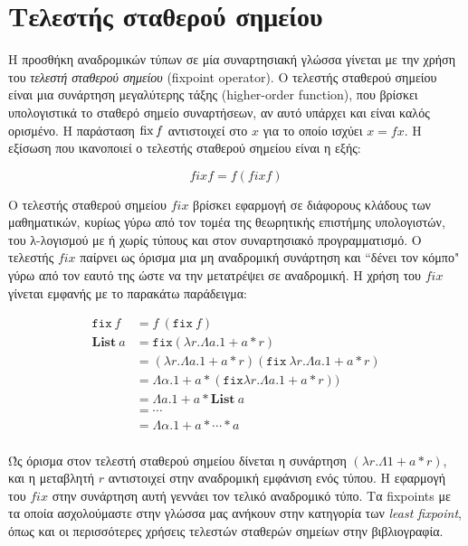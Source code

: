 
\section{Τελεστής σταθερού σημείου}

Η προσθήκη αναδρομικών τύπων σε μία συναρτησιακή γλώσσα γίνεται με την χρήση του 
\emph{τελεστή σταθερού σημείου} (fixpoint operator).  Ο τελεστής σταθερού σημείου
είναι μια συνάρτηση μεγαλύτερης τάξης (higher-order function), που βρίσκει υπολογιστικά
το σταθερό σημείο συναρτήσεων, αν αυτό υπάρχει και είναι καλός ορισμένο. Η παράσταση $\operatorname{fix} f$
αντιστοιχεί στο $x$ για το οποίο ισχύει $x = f x$.  Η εξίσωση που ικανοποιεί ο τελεστής σταθερού σημείου
είναι η εξής:

\begin{displaymath}
fix f = f ( fix f)
\end{displaymath}

Ο τελεστής σταθερού σημείου $fix$ βρίσκει εφαρμογή σε διάφορους κλάδους των μαθηματικών, κυρίως
γύρω από τον τομέα της θεωρητικής επιστήμης υπολογιστών, του λ-λογισμού με ή χωρίς τύπους και στον
συναρτησιακό προγραμματισμό. Ο τελεστής $fix$ παίρνει ως όρισμα μια μη αναδρομική συνάρτηση και
``δένει τον κόμπο" γύρω από τον εαυτό της ώστε να την μετατρέψει σε αναδρομική. Η χρήση του $fix$ γίνεται εμφανής με το παρακάτω παράδειγμα:

\begin{align*}
 \texttt{fix} \ f &= f \ (\texttt{fix} \ f)   \\
\textbf{List} ~a &= \texttt{fix} (\lambda r . \Lambda a. 1 + a * r) \\
&= (\lambda r. \Lambda a. 1 + a * r) (\texttt{fix} \ \lambda r. \Lambda a. 1 + a * r)  \\
&= \Lambda \alpha. 1 + a*(\texttt{fix} \lambda r. \Lambda a. 1 + a * r)) \\
 &= \Lambda a. 1 + a * \textbf{List} ~a \\
 &= \cdots \\
&= \Lambda \alpha. 1+ a * \cdots * a \\ 
\end{align*}

Ώς όρισμα στον τελεστή σταθερού σημείου δίνεται η συνάρτηση $(\lambda r. \Lambda 1 + a *r)$, και η
μεταβλητή $r$ αντιστοιχεί στην αναδρομική εμφάνιση ενός τύπου. Η εφαρμογή του $fix$ στην συνάρτηση
αυτή γεννάει τον τελικό αναδρομικό τύπο. Τα fixpoints με τα οποία ασχολούμαστε στην γλώσσα μας ανήκουν στην κατηγορία των \emph{least fixpoint}, όπως και οι περισσότερες χρήσεις τελεστών σταθερών σημείων στην βιβλιογραφία.

